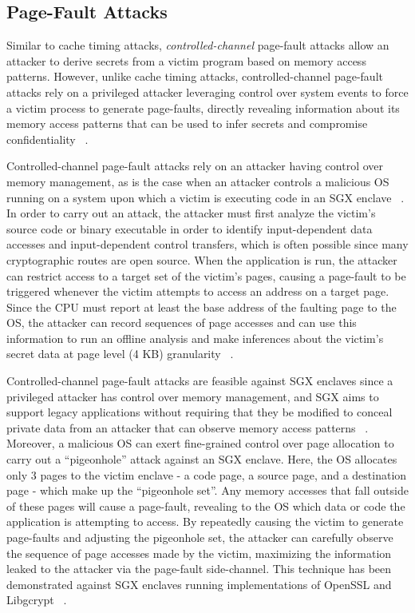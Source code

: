 \subsection{Page-Fault Attacks}

Similar to cache timing attacks, \emph{controlled-channel} page-fault attacks allow an attacker to derive secrets from a victim program based on memory access patterns. However, unlike cache timing attacks, controlled-channel page-fault attacks rely on a privileged attacker leveraging control over system events to force a victim process to generate page-faults, directly revealing information about its memory access patterns that can be used to infer secrets and compromise confidentiality ~\cite{xu_controlled-channel_2015}.

Controlled-channel page-fault attacks rely on an attacker having control over memory management, as is the case when an attacker controls a malicious OS running on a system upon which a victim is executing code in an SGX enclave ~\cite{intel_corporation_tutorial_2015}. In order to carry out an attack, the attacker must first analyze the victim's source code or binary executable in order to identify input-dependent data accesses and input-dependent control transfers, which is often possible since many cryptographic routes are open source. When the application is run, the attacker can restrict access to a target set of the victim's pages, causing a page-fault to be triggered whenever the victim attempts to access an address on a target page. Since the CPU must report at least the base address of the faulting page to the OS, the attacker can record sequences of page accesses and can use this information to run an offline analysis and make inferences about the victim's secret data at page level (4 KB) granularity ~\cite{xu_controlled-channel_2015, shinde_preventing_2015}.

Controlled-channel page-fault attacks are feasible against SGX enclaves since a privileged attacker has control over memory management, and SGX aims to support legacy applications without requiring that they be modified to conceal private data from an attacker that can observe memory access patterns ~\cite{xu_controlled-channel_2015}. Moreover, a malicious OS can exert fine-grained control over page allocation to carry out a ``pigeonhole'' attack against an SGX enclave. Here, the OS allocates only 3 pages to the victim enclave - a code page, a source page, and a destination page - which make up the ``pigeonhole set''. Any memory accesses that fall outside of these pages will cause a page-fault, revealing to the OS which data or code the application is attempting to access. By repeatedly causing the victim to generate page-faults and adjusting the pigeonhole set, the attacker can carefully observe the sequence of page accesses made by the victim, maximizing the information leaked to the attacker via the page-fault side-channel. This technique has been demonstrated against SGX enclaves running implementations of OpenSSL and Libgcrypt ~\cite{shinde_preventing_2015}. 

